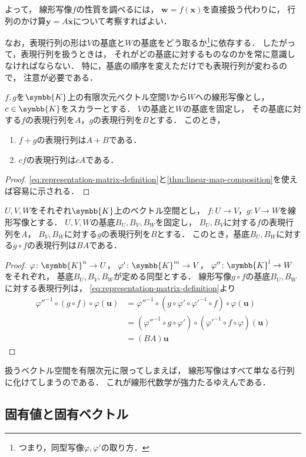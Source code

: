 \documentclass[../sotsu.tex]{subfiles}
\begin{document}
よって，
線形写像$f$の性質を調べるには，
$\symbf{w} = f(\symbf{x})$を直接扱う代わりに，
行列のかけ算$\symbf{y} = A \symbf{x}$について考察すればよい．

なお，表現行列の形は$V$の基底と$W$の基底をどう取るか\footnote{
    つまり，同型写像$\varphi, \varphi'$の取り方．
}に依存する．
したがって，表現行列を扱うときは，
それがどの基底に対するものなのかを常に意識しなければならない．
特に，基底の順序を変えただけでも表現行列が変わるので，
注意が必要である．

\begin{proposition}
    $f, g$を$\symbb{K}$上の有限次元ベクトル空間$V$から$W$への線形写像とし，
    $c \in \symbb{K}$をスカラーとする．
    $V$の基底と$W$の基底を固定し，
    その基底に対する$f$の表現行列を$A$，$g$の表現行列を$B$とする．
    このとき，
    \begin{enumerate}
        \item $f + g$の表現行列は$A + B$である．
        \item $cf$の表現行列は$cA$である．
    \end{enumerate}
\end{proposition}

\begin{proof}
    \cref{eq:representation-matrix-definition}と\cref{thm:linear-map-composition}を使えば容易に示される．
\end{proof}


\begin{theorem}
    $U, V, W$をそれぞれ$\symbb{K}$上のベクトル空間とし，
    $f \colon U \to V$，$g \colon V \to W$を線形写像とする．
    $U, V, W$の基底$B_U, B_V, B_W$を固定し，
    $B_U, B_V$に対する$f$の表現行列を$A$，
    $B_V, B_W$に対する$g$の表現行列を$B$とする．
    このとき，基底$B_U, B_W$に対する$g \circ f$の表現行列は$BA$である．
\end{theorem}

\begin{proof}
    $\varphi   \colon \symbb{K}^n \to U$，
    $\varphi'  \colon \symbb{K}^m \to V$，
    $\varphi'' \colon \symbb{K}^l \to W$をそれぞれ，
    基底$B_U, B_V, B_W$が定める同型とする．
    線形写像$g \circ f$の基底$B_U, B_W$に対する表現行列は，
    \cref{eq:representation-matrix-definition}より
    \begin{equation*}
        \begin{split}
            \varphi''^{-1} \circ (g \circ f) \circ \varphi (\symbf{u})
            &= \varphi''^{-1} \circ (g \circ \varphi' \circ \varphi'^{-1} \circ f) \circ \varphi (\symbf{u})
            \\
            &= (\varphi''^{-1} \circ g \circ \varphi') \circ (\varphi'^{-1} \circ f \circ \varphi) (\symbf{u})
            \\
            &= (B A) \symbf{u}
        \end{split}
    \end{equation*}
\end{proof}


扱うベクトル空間を有限次元に限ってしまえば，
線形写像はすべて単なる行列に化けてしまうのである．
これが線形代数学が強力たるゆえんである．



\subsection{固有値と固有ベクトル}
\label{sec:eigenvalue-and-eigenvector}
\end{document}
